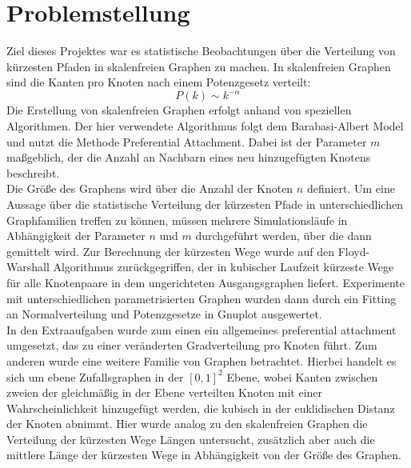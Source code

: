 \documentclass[10pt]{article}
\begin{document}
\lstset{
	language=C,
	basicstyle=\footnotesize,
	frame=tb,
	xleftmargin=.2\textwidth,
	xrightmargin=.2\textwidth
}
\onehalfspacing

\tableofcontents
\newpage
\section{Problemstellung}
 
Ziel dieses Projektes war es statistische Beobachtungen über die Verteilung von kürzesten Pfaden in skalenfreien Graphen zu machen. In skalenfreien Graphen sind die Kanten pro Knoten nach einem Potenzgesetz verteilt: 
\begin{equation*}
P(k) \sim k^{-\alpha}
\end{equation*}
Die Erstellung von skalenfreien Graphen erfolgt anhand von speziellen Algorithmen. Der hier verwendete Algorithmus folgt dem Barabasi-Albert Model und nutzt die Methode Preferential Attachment. Dabei ist der Parameter $m$ maßgeblich, der die Anzahl an Nachbarn eines neu hinzugefügten Knotens beschreibt. \\

Die Größe des Graphens wird über die Anzahl der Knoten $n$ definiert. Um eine Aussage über die statistische Verteilung der kürzesten Pfade in unterschiedlichen Graphfamilien treffen zu können, müssen mehrere Simulationsläufe in Abhängigkeit der Parameter $n$ und $m$ durchgeführt werden, über die dann gemittelt wird.
Zur Berechnung der kürzesten Wege wurde auf den Floyd-Warshall Algorithmus zurückgegriffen, der in kubischer Laufzeit kürzeste Wege für alle Knotenpaare in dem ungerichteten Ausgangsgraphen liefert.
Experimente mit unterschiedlichen parametrisierten Graphen wurden dann durch ein Fitting an Normalverteilung und Potenzgesetze in Gnuplot ausgewertet.\\

In den Extraaufgaben wurde zum einen ein allgemeines preferential attachment umgesetzt, das zu einer veränderten Gradverteilung pro Knoten führt. Zum anderen wurde eine weitere Familie von Graphen betrachtet. Hierbei handelt es sich um ebene Zufallsgraphen in der $[0,1]^2$ Ebene, wobei Kanten zwischen zweien der gleichmäßig in der Ebene verteilten Knoten mit einer Wahrscheinlichkeit hinzugefügt werden, die kubisch in der euklidischen Distanz der Knoten abnimmt. Hier wurde analog zu den skalenfreien Graphen die Verteilung der kürzesten Wege Längen untersucht, zusätzlich aber auch die mittlere Länge der kürzesten Wege in Abhängigkeit von der Größe des Graphen.
\end{document}
